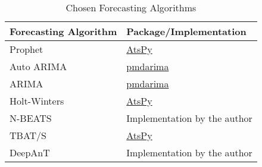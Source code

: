 \begin{table}[h]\centering
        \begin{tabular}{ll}
            Forecasting Algorithm                                       & Package/Implementation    \\\midrule         
            Prophet~\cite{Taylor.2017}                                  & \href{https://github.com/firmai/atspy}{AtsPy}             \\\addlinespace
            Auto ARIMA~\cite{Smith.2017}                                & \href{https://github.com/alkaline-ml/pmdarima}{pmdarima}  \\\addlinespace
            ARIMA~\cite[Hyperparameters adopted from][]{Braei.2020}     & \href{https://github.com/alkaline-ml/pmdarima}{pmdarima}  \\\addlinespace
            Holt-Winters~\cite{Winters.1960}                            & \href{https://github.com/firmai/atspy}{AtsPy}             \\\addlinespace
            N-BEATS~\cite{Oreshkin.2020}                                & Implementation by the author                              \\\addlinespace
            TBAT/S                                                      & \href{https://github.com/firmai/atspy}{AtsPy}             \\\addlinespace
            DeepAnT~\cite{Munir.2019}                                   & Implementation by the author                              \\
        \end{tabular}
    \caption{Chosen Forecasting Algorithms}\label{tab:chosen-forecasting-algo}
\end{table}

